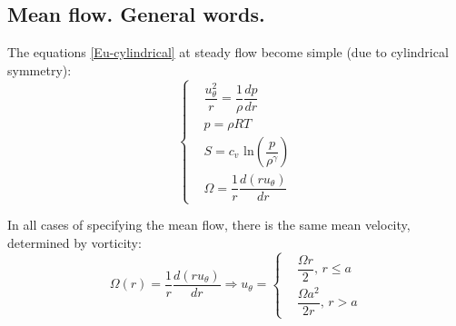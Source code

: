 \subsection{Mean flow. General words.}

The equations \eqref{Eu-cylindrical} at steady flow become simple (due to cylindrical symmetry):
\begin{equation}
	\label{Eu-cylindrical-steady}
	\left\{
	\begin{aligned}
		& \dfrac{u_{\theta}^2}{r} = \dfrac{1}{\rho}\dfrac{dp}{dr} \\
		& p = \rho R T \\
		& S = c_{v} \text{ ln} \left(\dfrac{p}{\rho^{\gamma}}\right) \\
		& \Omega = \dfrac{1}{r}\dfrac{d (r u_{\theta})}{dr}
	\end{aligned}
	\right.
\end{equation}

In all cases of specifying the mean flow, there is the same mean velocity, determined by vorticity:
\begin{equation}
	\Omega(r) = \dfrac{1}{r}\dfrac{d (r u_{\theta})}{d r} \Rightarrow
	u_{\theta} = 
	\left\{
	\begin{aligned}
		& \dfrac{\Omega r}{2}, \, r \leqslant a \\
		& \dfrac{\Omega a^2}{2r}, \, r > a
	\end{aligned}
	\right.
\end{equation}